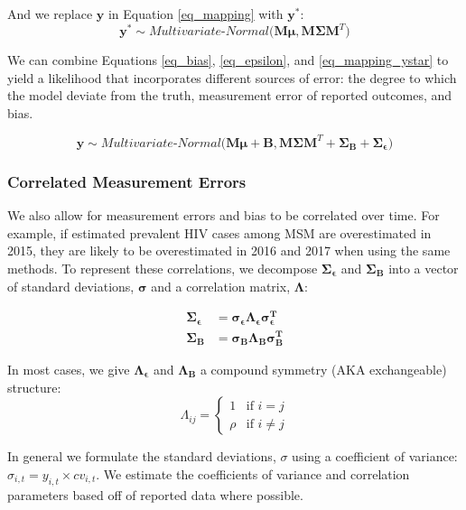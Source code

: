 \documentclass{article}
\begin{document}
And we replace $\bm{y}$ in Equation \ref{eq_mapping} with $\bm{y^*}$:
\begin{equation}
	\bm{y^*} \sim Multivariate\text{-}Normal\big(\bm{M} \bm{\mu}, \bm{M} \bm{\Sigma} \bm{M}^T\big) \label{eq_mapping_ystar}
\end{equation}

We can combine Equations \ref{eq_bias}, \ref{eq_epsilon}, and \ref{eq_mapping_ystar} to yield a likelihood that incorporates different sources of error: the degree to which the model deviate from the truth, measurement error of reported outcomes, and bias.

\begin{equation}
	\bm{y} \sim Multivariate\textit{-}Normal\Big(\bm{M} \bm{\mu} + \bm{B},
		\bm{M} \bm{\Sigma} \bm{M}^T + \bm{\Sigma_B} + \bm{\Sigma_\epsilon}\Big)
\end{equation}

\subsubsection{Correlated Measurement Errors}\label{correlated_measurement_error}

We also allow for measurement errors and bias to be correlated over time. For example, if estimated prevalent HIV cases among MSM are overestimated in 2015, they are likely to be overestimated in 2016 and 2017 when using the same methods.\cite{fojo2017} To represent these correlations, we decompose $\bm{\Sigma_\epsilon}$ and $\bm{\Sigma_B}$ into a vector of standard deviations, $\bm{\sigma}$ and a correlation matrix, $\bm{\Lambda}$:


\begin{align}
	\bm{\Sigma_\epsilon} &= \bm{\sigma_\epsilon} \bm{\Lambda_\epsilon} \bm{\sigma_\epsilon^T}\\
	\bm{\Sigma_B} &= \bm{\sigma_B} \bm{\Lambda_B} \bm{\sigma_B^T}
\end{align}

In most cases, we give $\bm{\Lambda_\epsilon}$ and $\bm{\Lambda_B}$ a compound symmetry (AKA exchangeable) structure:
\begin{equation}
	\Lambda_{ij} = \begin{cases}
		1 & \text{if } i=j \\
		\rho & \text{if } i \neq j
	\end{cases}
\end{equation}

In general we formulate the standard deviations, $\sigma$ using a coefficient of variance: $\sigma_{i,t} = y_{i,t} \times cv_{i,t}$. We estimate the coefficients of variance and correlation parameters based off of reported data where possible.
\end{document}
